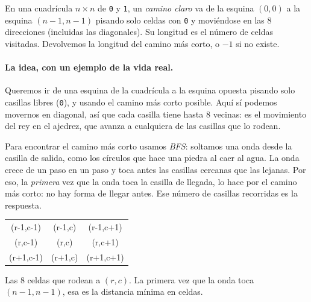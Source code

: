 
En una cuadrícula $n\times n$ de \texttt{0} y \texttt{1}, un \emph{camino
claro} va de la esquina $(0,0)$ a la esquina $(n{-}1,n{-}1)$ pisando solo
celdas con \texttt{0} y moviéndose en las 8 direcciones (incluidas las
diagonales). Su longitud es el número de celdas visitadas. Devolvemos la
longitud del camino más corto, o $-1$ si no existe.

\paragraph{La idea, con un ejemplo de la vida real.} Queremos ir de una esquina
de la cuadrícula a la esquina opuesta pisando solo casillas libres (\texttt{0}), y
usando el camino más corto posible. Aquí sí podemos movernos en diagonal, así
que cada casilla tiene hasta 8 vecinas: es el movimiento del rey en el ajedrez,
que avanza a cualquiera de las casillas que lo rodean.

Para encontrar el camino más corto usamos \emph{BFS}:
soltamos una onda desde la casilla de salida, como los círculos que hace una
piedra al caer al agua. La onda crece de un paso en un paso y toca antes las
casillas cercanas que las lejanas. Por eso, la \emph{primera} vez que la onda
toca la casilla de llegada, lo hace por el camino más corto: no hay forma de
llegar antes. Ese número de casillas recorridas es la respuesta.

\begin{center}
\ttfamily
\begin{tabular}{ccc}
(r-1,c-1) & (r-1,c) & (r-1,c+1)\\
(r,c-1) & (r,c) & (r,c+1)\\
(r+1,c-1) & (r+1,c) & (r+1,c+1)\\
\end{tabular}
\end{center}

\noindent Las 8 celdas que rodean a $(r,c)$. La primera vez que la onda toca
$(n{-}1,n{-}1)$, esa es la distancia mínima en celdas.

